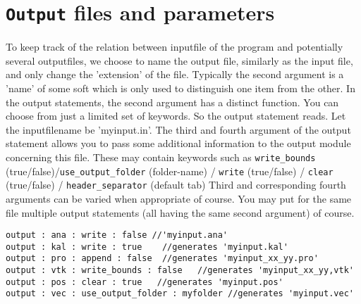 \documentclass{article}
\begin{document}
\section{{\tt Output} files and parameters}
\label{sec:output}
To keep track of the relation between inputfile of the program and potentially several outputfiles, we choose to name the output file, similarly as the input file, and only change the 'extension' of the file. Typically the second argument is a 'name' of some soft which is only used to distinguish one item from the other. In the output statements, the second argument has a distinct function. You can choose from  just a limited set of keywords. So the output statement reads. Let the inputfilename be 'myinput.in'. The third and fourth argument of the output statement allows you to pass some additional information to the output module concerning this file. These may contain keywords such as  
{\tt write\_bounds} (true/false)/{\tt use\_output\_folder} (folder-name) / {\tt write} (true/false) / {\tt clear} (true/false) / {\tt header\_separator} (default tab) Third and corresponding fourth arguments can be varied when appropriate of course. You may put for the same file multiple output statements (all having the same second argument) of course.

\begin{verbatim}
output : ana : write : false //'myinput.ana'
output : kal : write : true    //generates 'myinput.kal'
output : pro : append : false  //generates 'myinput_xx_yy.pro'
output : vtk : write_bounds : false   //generates 'myinput_xx_yy,vtk'
output : pos : clear : true   //generates 'myinput.pos'
output : vec : use_output_folder : myfolder //generates 'myinput.vec'
\end{verbatim}
\end{document}
